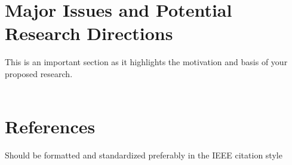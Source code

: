 \documentclass[a4paper,12pt]{article}
\begin{document}
	\section{Major Issues and Potential Research Directions}
	\begin{adjustwidth}{3.27em}{0em}
		This is an important section as it highlights the motivation and basis of your proposed research.\\
		~\\
	\end{adjustwidth}
	
	\section{References}
	\begin{adjustwidth}{3.27em}{0em}
		Should be formatted and standardized preferably in the IEEE citation style
		
		\printbibliography[heading=none]
		
	\end{adjustwidth}
	
\end{document}
